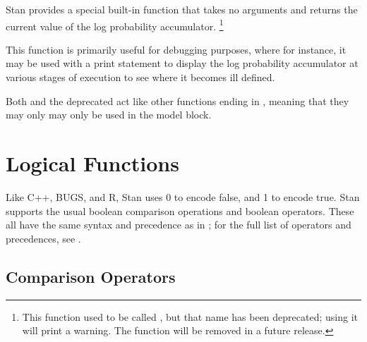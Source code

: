 Stan provides a special built-in function  that takes no
arguments and returns the current value of the log probability
accumulator.%
%
\footnote{This function used to be called , but that
  name has been deprecated; using it will print a warning.  The
  function  will be removed in a future release.}

This function is primarily useful for debugging purposes, where for
instance, it may be used with a print statement to display the log
probability accumulator at various stages of execution to see where it
becomes ill defined.

\begin{description}
\end{description}

Both  and the deprecated  act like other
functions ending in , meaning that they may only may only
be used in the model block.

\section{Logical Functions}

Like C++, BUGS, and R, Stan uses 0 to encode false, and 1 to encode
true.  Stan supports the usual boolean comparison operations and
boolean operators.  These all have the same syntax and precedence as
in \Cpp; for the full list of operators and precedences, see
.  


\subsection{Comparison Operators}

